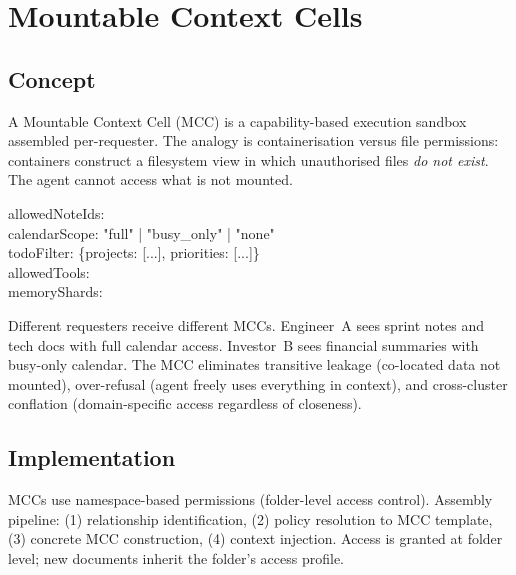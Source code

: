 \section{Mountable Context Cells}
\label{sec:mcc_design}

\subsection{Concept}

A Mountable Context Cell (MCC) is a capability-based execution sandbox assembled per-requester. The analogy is containerisation versus file permissions: containers construct a filesystem view in which unauthorised files \textit{do not exist}. The agent cannot access what is not mounted.

\begin{tcolorbox}[colback=gray!5!white, colframe=gray!60!black, fonttitle=\bfseries, title={MCC Specification}]
\small\ttfamily
allowedNoteIds: \\
calendarScope: \normalfont "full" | "busy\_only" | "none"\\
todoFilter: \normalfont \{projects: [...], priorities: [...]\}\\
allowedTools: \\
memoryShards: 
\end{tcolorbox}

Different requesters receive different MCCs. Engineer~A sees sprint notes and tech docs with full calendar access. Investor~B sees financial summaries with busy-only calendar. The MCC eliminates transitive leakage (co-located data not mounted), over-refusal (agent freely uses everything in context), and cross-cluster conflation (domain-specific access regardless of closeness).

\subsection{Implementation}

MCCs use namespace-based permissions (folder-level access control). Assembly pipeline: (1) relationship identification, (2) policy resolution to MCC template, (3) concrete MCC construction, (4) context injection. Access is granted at folder level; new documents inherit the folder's access profile.


